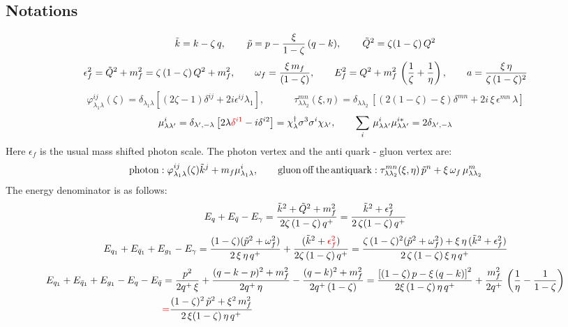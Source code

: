 \documentclass[9pt]{article}
\newcommand{\chg}[1]{{\color{red}#1}}
\numberwithin{equation}{section}
\begin{document}
\subsection{Notations}
$$\Tilde{k} = k - \zeta\,q,\hspace{2em}\, \Tilde{p} = p - \frac{\xi}{1-\zeta}\, (q-k),\hspace{2em}\,\Tilde{Q}^{2} = \zeta(1-\zeta)\, Q^{2}$$
$$\epsilon^{2}_{f} = \Tilde{Q}^{2}+ m^{2}_{f} = \zeta\, (1-\zeta)\,Q^{2} +m^{2}_{f}, \hspace{2em} \omega_{f} = \frac{\xi\,m_{f}}{(1-\zeta)}, \hspace{2em} E^{2}_{f} = Q^{2} +m^{2}_{f}\,\left(\frac{1}{\zeta} + \frac{1}{\eta}\right),\hspace{2em} a = \frac{\xi\,\eta}{\zeta\,(1-\zeta)^{2}}$$
$$\varphi^{ij}_{\lambda_{1}\lambda}(\zeta) = \delta_{\lambda_{1}\lambda}\left[(2\zeta -1)\delta^{ij} +2i\epsilon^{ij}\lambda_{1}\right],\hspace{3em} \tau^{mn}_{\lambda \lambda_{2}}(\xi,\eta) = \delta_{\lambda \lambda_{2}}\,\left[(2(1-\zeta)-\xi)\delta^{mn}+2i\,\xi\,\epsilon^{mn}\,\lambda\right] $$
\label{chg:dila}$$\mu^{i}_{\lambda\lambda'} = \delta_{\lambda',-\lambda}\left[2\lambda\chg{\delta^{i1}} - i\delta^{i2}\right] = \chi^{\dagger}_{\lambda}\sigma^{3}\sigma^{i}\chi_{\lambda'},\hspace{2em} \sum_{i}\,\mu^{i}_{\lambda\lambda'}\mu^{i*}_{\lambda\lambda'} = 2\delta_{\lambda',-\lambda}$$
Here $\epsilon_{f}$ is the usual mass shifted photon scale. The photon vertex and the anti quark - gluon vertex are:
$$\mathrm{photon}: \varphi^{ij}_{\lambda_{1}\lambda}(\zeta)\Tilde{k}^{j} + m_{f}\mu^{i}_{\lambda_{1}\lambda},\hspace{2em} \mathrm{gluon\, off\, the\, antiquark}: \tau^{mn}_{\lambda\lambda_{2}}(\xi,\eta)\, \Tilde{p}^{n} + \xi\, \omega_{f}\,\mu^{m}_{\lambda\lambda_{2}}$$
The energy denominator is as follows:
$$E_{q}+E_{\Bar{q}}-E_{\gamma} = \frac{\Tilde{k}^{2}+\Tilde{Q}^{2}+m^{2}_{f}}{2\zeta\, (1-\zeta)\,q^{+}} = \frac{\Tilde{k}^{2}+\epsilon^{2}_{f}}{2\,\zeta(1-\zeta)\,q^{+}}$$
\label{chg:Eden}$$E_{q_{1}}+E_{\Bar{q}_{1}}+E_{g_{1}}-E_{\gamma} = \frac{(1-\zeta) (\Tilde{p}^{2}+\omega^{2}_{f})}{2\,\xi\, \eta\,q^{+}} + \frac{(\Tilde{k}^{2}+\chg{\epsilon_{f}^{2}})}{2\zeta\,(1-\zeta)\,q^{+}} = \frac{\zeta\,(1-\zeta)^{2} (\Tilde{p}^{2}+\omega^{2}_{f}) + \xi\,\eta\, (\Tilde{k}^{2}+\epsilon^{2}_{f})}{2\,\zeta\,(1-\zeta)\,\xi\,\eta\,q^{+}}$$
\begin{align}
    E_{q_{1}}+E_{\Bar{q}_{1}}+E_{g_{1}}-E_{q}-E_{\Bar{q}} & = \frac{p^{2}}{2q^{+}\,\xi}+\frac{(q-k-p)^{2}+m^{2}_{f}}{2q^{+}\, \eta}-\frac{(q-k)^{2}+m^{2}_{f}}{2q^{+}\, (1-\zeta)} = \frac{\left[(1-\zeta)\,p - \xi\,(q-k)\right]^{2}}{2\xi\,(1-\zeta)\,\eta\,q^{+}} +\frac{m^{2}_{f}}{2q^{+}}\,\left(\frac{1}{\eta} - \frac{1}{1-\zeta}\right)\notag \\ & \chg{=} \frac{(1-\zeta)^{2}\,\Tilde{p}^{2} + \xi^{2}\,m^{2}_{f}}{2\,\xi(1-\zeta)\,\eta\,q^{+}}
\label{chg:eq}\end{align}
\end{document}
